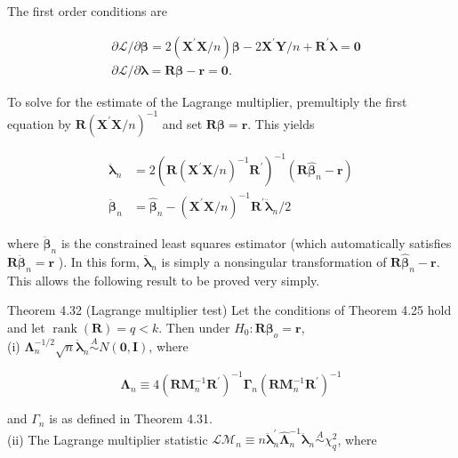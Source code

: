 \documentclass[10pt]{article}
\begin{document}
The first order conditions are

$$
\begin{aligned}
& \partial \mathcal{L} / \partial \boldsymbol{\beta}=2\left(\mathbf{X}^{\prime} \mathbf{X} / n\right) \boldsymbol{\beta}-2 \mathbf{X}^{\prime} \mathbf{Y} / n+\mathbf{R}^{\prime} \boldsymbol{\lambda}=\mathbf{0} \\
& \partial \mathcal{L} / \partial \boldsymbol{\lambda}=\mathbf{R} \boldsymbol{\beta}-\mathbf{r}=\mathbf{0} .
\end{aligned}
$$

To solve for the estimate of the Lagrange multiplier, premultiply the first equation by $\mathbf{R}\left(\mathbf{X}^{\prime} \mathbf{X} / n\right)^{-1}$ and set $\mathbf{R} \boldsymbol{\beta}=\mathbf{r}$. This yields

$$
\begin{aligned}
\ddot{\boldsymbol{\lambda}}_{n} & =2\left(\mathbf{R}\left(\mathbf{X}^{\prime} \mathbf{X} / n\right)^{-1} \mathbf{R}^{\prime}\right)^{-1}\left(\mathbf{R} \hat{\boldsymbol{\beta}}_{n}-\mathbf{r}\right) \\
\ddot{\boldsymbol{\beta}}_{n} & =\hat{\boldsymbol{\beta}}_{n}-\left(\mathbf{X}^{\prime} \mathbf{X} / n\right)^{-1} \mathbf{R}^{\prime} \ddot{\boldsymbol{\lambda}}_{n} / 2
\end{aligned}
$$

where $\ddot{\boldsymbol{\beta}}_{n}$ is the constrained least squares estimator (which automatically satisfies $\mathbf{R} \ddot{\boldsymbol{\beta}}_{n}=\mathbf{r}$ ). In this form, $\ddot{\boldsymbol{\lambda}}_{n}$ is simply a nonsingular transformation of $\mathbf{R} \hat{\boldsymbol{\beta}}_{n}-\mathbf{r}$. This allows the following result to be proved very simply.

Theorem 4.32 (Lagrange multiplier test) Let the conditions of Theorem 4.25 hold and let $\operatorname{rank}(\mathbf{R})=q<k$. Then under $H_{0}: \mathbf{R} \boldsymbol{\beta}_{o}=\mathbf{r}$,\\
(i) $\boldsymbol{\Lambda}_{n}^{-1 / 2} \sqrt{n} \ddot{\boldsymbol{\lambda}}_{n} \stackrel{A}{\sim} N(\mathbf{0}, \mathbf{I})$, where

$$
\boldsymbol{\Lambda}_{n} \equiv 4\left(\mathbf{R} \mathbf{M}_{n}^{-1} \mathbf{R}^{\prime}\right)^{-1} \boldsymbol{\Gamma}_{n}\left(\mathbf{R} \mathbf{M}_{n}^{-1} \mathbf{R}^{\prime}\right)^{-1}
$$

and $\Gamma_{n}$ is as defined in Theorem 4.31.\\
(ii) The Lagrange multiplier statistic $\mathcal{L} \mathcal{M}_{n} \equiv n \ddot{\boldsymbol{\lambda}}_{n}^{\prime} \hat{\boldsymbol{\Lambda}}_{n}^{-1} \ddot{\boldsymbol{\lambda}}_{n} \stackrel{A}{\sim} \chi_{q}^{2}$, where
\end{document}
